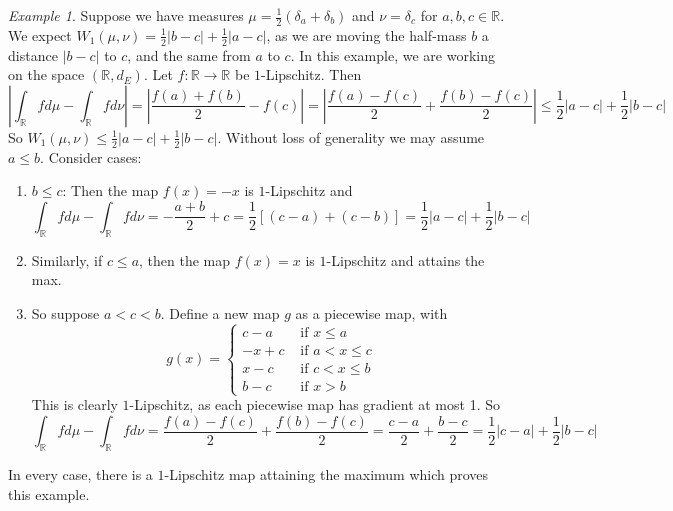 \documentclass[11pt,a4paper]{article}
\theoremstyle{remark}
\newtheorem{example}[theorem]{Example}
\begin{document}
\begin{example}
Suppose we have measures $\mu = \frac{1}{2}(\delta _a + \delta_b)$ and $\nu = \delta _c$ for $a,b,c \in \mathbb{R}$. We expect $W_1 (\mu , \nu) = \frac{1}{2}|b-c| + \frac{1}{2}|a-c|$, as we are moving the half-mass $b$ a distance $|b-c|$ to $c$, and the same from $a$ to $c$. In this example, we are working on the space $(\mathbb{R}, d_E)$. Let $f: \mathbb{R} \to \mathbb{R}$ be $1$-Lipschitz. Then \[
\left |\int _\mathbb{R} f d\mu - \int _\mathbb{R} f d \nu \right |= \left|\frac{f(a) + f(b)}{2} - f(c) \right| = \left | \frac{f(a) - f(c)}{2} + \frac{f(b) - f(c)}{2}\right | \le \frac{1}{2} |a-c| + \frac{1}{2} | b - c|
\]
So $W_1 (\mu, \nu) \le \frac{1}{2}|a-c| + \frac{1}{2}|b-c|$. 
Without loss of generality we may assume $a \le b$. Consider cases:
\begin{enumerate}
    \item $b \le c$: Then the map $f(x) = -x$ is $1$-Lipschitz and \[
 \int _\mathbb{R} f d\mu - \int _\mathbb{R} f d\nu  = -\frac{a + b}{2} + c   = \frac{1}{2} [(c-a) + (c-b)] = \frac{1}{2} | a - c| + \frac{1}{2} |b-c|
\] 
    \item Similarly, if $c \le a$, then the map $f(x) = x$ is $1$-Lipschitz and attains the max.
    \item So suppose $a < c < b$. Define a new map $g$ as a piecewise map, with 
    \[
    g(x) = 
    \begin{cases}
        c-a & \text{ if }x \le a \\ 
        -x + c & \text{ if } a < x \le c \\ 
        x - c & \text{ if } c < x \le b \\
        b-c & \text{ if } x > b
    \end{cases}
    \]
    This is clearly $1$-Lipschitz, as each piecewise map has gradient at most 1. So \[
    \int_\mathbb{R} f d\mu - \int_\mathbb{R} f d\nu =  \frac{f(a) - f(c)}{2} + \frac{f(b) - f(c)}{2}  = \frac{c-a}{2} + \frac{b-c}{2} = \frac{1}{2} |c-a| + \frac{1}{2}|b-c|
    \]
\end{enumerate}
In every case, there is a $1$-Lipschitz map attaining the maximum which proves this example.

\end{example}

\end{document}
